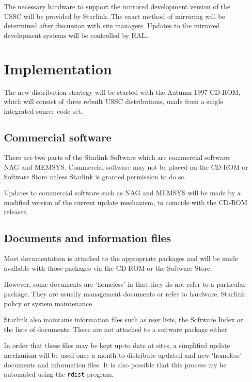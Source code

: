 \documentclass[twoside,11pt]{article}
\newcommand{\xlabel}[1]{}
\begin{document}
The necessary hardware to support the mirrored development version of the
USSC will be provided by Starlink.  The exact method of mirroring will be
determined after discussion with site managers.  Updates to the mirrored 
development systems will be controlled by RAL.

\section{\label{implementation}\xlabel{implementation}Implementation}

The new distribution strategy will be started with the Autumn 1997 CD-ROM, which
will consist of three rebuilt USSC distributions, made from a single
integrated source code set.

\subsection{\label{commercial_software}\xlabel{commercial_software}Commercial software}

There are two parts of the Starlink Software which are commercial
software: NAG and MEMSYS\@.  Commercial software may not be placed on
the CD-ROM or Software Store unless Starlink is granted permission to
do so.

Updates to commercial software such as NAG and MEMSYS will be made by a
modified version of the current  update mechanism, to coincide with the
CD-ROM releases.

\subsection{\label{documents_and_information_files}\xlabel{documents_and_information_files}Documents and information files}

Most documentation is attached to the appropriate packages and will be 
made available with those packages via the CD-ROM or the Software Store.

However, some documents are `homeless' in that they do not refer to a
particular package.  They are usually management documents or refer to
hardware, Starlink policy or system maintenance.

Starlink also maintains information files such as user lists, the
Software Index or the lists of documents.  These are not attached to a
software package either.

In order that these files may be kept up-to date at sites, a simplified
update mechanism will be used once a month to distribute updated
and new `homeless' documents and information files.  It is also possible
that this process my be automated using the \texttt{rdist} program.
\end{document}
